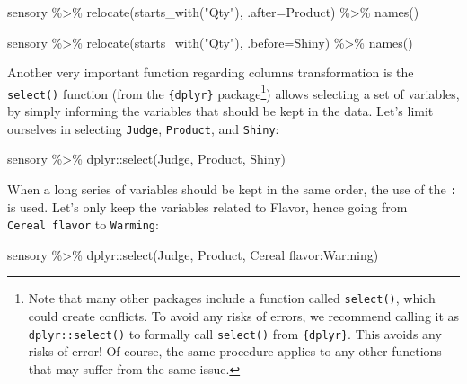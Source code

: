 \documentclass[
]{book}
\newenvironment{Shaded}{\begin{snugshade}}{\end{snugshade}}
\newcommand{\AttributeTok}[1]{\textcolor[rgb]{0.77,0.63,0.00}{#1}}
\newcommand{\FunctionTok}[1]{\textcolor[rgb]{0.00,0.00,0.00}{#1}}
\newcommand{\NormalTok}[1]{#1}
\newcommand{\SpecialCharTok}[1]{\textcolor[rgb]{0.00,0.00,0.00}{#1}}
\newcommand{\StringTok}[1]{\textcolor[rgb]{0.31,0.60,0.02}{#1}}
\begin{document}
\begin{Shaded}
\begin{Highlighting}[]
\NormalTok{sensory }\SpecialCharTok{\%\textgreater{}\%} 
  \FunctionTok{relocate}\NormalTok{(}\FunctionTok{starts\_with}\NormalTok{(}\StringTok{"Qty"}\NormalTok{), }\AttributeTok{.after=}\NormalTok{Product) }\SpecialCharTok{\%\textgreater{}\%} 
  \FunctionTok{names}\NormalTok{()}

\NormalTok{sensory }\SpecialCharTok{\%\textgreater{}\%} 
  \FunctionTok{relocate}\NormalTok{(}\FunctionTok{starts\_with}\NormalTok{(}\StringTok{"Qty"}\NormalTok{), }\AttributeTok{.before=}\NormalTok{Shiny) }\SpecialCharTok{\%\textgreater{}\%} 
  \FunctionTok{names}\NormalTok{()}
\end{Highlighting}
\end{Shaded}

Another very important function regarding columns transformation is the \texttt{select()} function (from the \texttt{\{dplyr\}} package\footnote{Note that many other packages include a function called \texttt{select()}, which could create conflicts. To avoid any risks of errors, we recommend calling it as \texttt{dplyr::select()} to formally call \texttt{select()} from \texttt{\{dplyr\}}. This avoids any risks of error! Of course, the same procedure applies to any other functions that may suffer from the same issue.}) allows selecting a set of variables, by simply informing the variables that should be kept in the data. Let's limit ourselves in selecting \texttt{Judge}, \texttt{Product}, and \texttt{Shiny}:

\begin{Shaded}
\begin{Highlighting}[]
\NormalTok{sensory }\SpecialCharTok{\%\textgreater{}\%} 
\NormalTok{  dplyr}\SpecialCharTok{::}\FunctionTok{select}\NormalTok{(Judge, Product, Shiny)}
\end{Highlighting}
\end{Shaded}

When a long series of variables should be kept in the same order, the use of the \texttt{:} is used.
Let's only keep the variables related to Flavor, hence going from \texttt{Cereal\ flavor} to \texttt{Warming}:

\begin{Shaded}
\begin{Highlighting}[]
\NormalTok{sensory }\SpecialCharTok{\%\textgreater{}\%} 
\NormalTok{  dplyr}\SpecialCharTok{::}\FunctionTok{select}\NormalTok{(Judge, Product, }\StringTok{\textasciigrave{}}\AttributeTok{Cereal flavor}\StringTok{\textasciigrave{}}\SpecialCharTok{:}\NormalTok{Warming)}
\end{Highlighting}
\end{Shaded}
\end{document}
